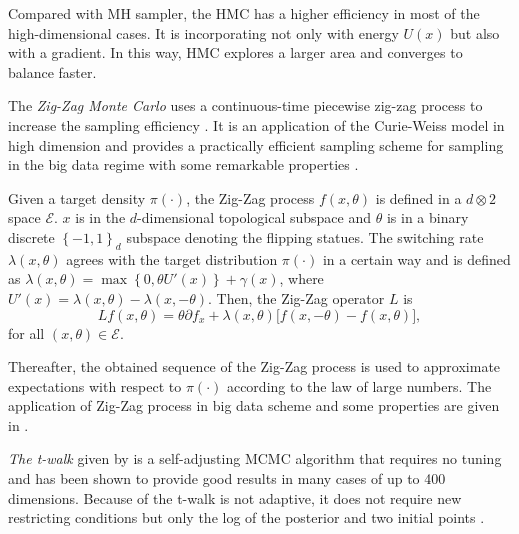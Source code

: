 Compared with MH sampler, the HMC has a higher efficiency in most of the high-dimensional cases. It is incorporating not only with energy $U(x)$ but also with a gradient. In this way, HMC explores a larger area and converges to balance faster. 


The \textit{Zig-Zag Monte Carlo} uses a continuous-time piecewise zig-zag process to increase the sampling efficiency \citep{bierkens2016piecewise}. It is an application of the Curie-Weiss model in high dimension and provides a practically efficient sampling scheme for sampling in the big data regime with some remarkable properties \citep{turitsyn2011irreversible, bierkens2017limit}. 

Given a target density $\pi(\cdot)$, the Zig-Zag process $f(x,\theta)$ is defined in a $d \otimes 2$ space $\mathcal{E}$. $x$ is in the $d$-dimensional topological subspace and $\theta$ is in a binary discrete $\left\lbrace -1,1\right\rbrace_d$ subspace denoting the flipping statues. The switching rate $\lambda(x,\theta)$ agrees with the target distribution $\pi(\cdot)$ in a certain way and is defined as $\lambda(x,\theta) = \max \left\lbrace 0,\theta U'(x) \right\rbrace +\gamma(x)$, where $U'(x)  = \lambda(x,\theta) - \lambda(x,-\theta)$. Then, the Zig-Zag operator $L$ is 
\begin{equation}
Lf(x,\theta)=\theta\partial f_x+\lambda(x,\theta)\lbrack f(x,-\theta)-f(x,\theta )\rbrack,
\end{equation}
for all $(x,\theta)\in \mathcal{E}$. 

Thereafter, the obtained sequence of the Zig-Zag process is used to approximate expectations with respect to $\pi(\cdot)$ according to the law of large numbers. 
The application of Zig-Zag process in big data scheme and some properties are given in \citep{bierkens2017limit}. %




\textit{The t-walk} given by \cite{christen2010general} is a self-adjusting MCMC algorithm that requires no tuning and has been shown to provide good results in many cases of up to 400 dimensions. Because of the t-walk is not adaptive, it does not require new restricting conditions but only the log of the posterior and two initial points \citep{blaauw2011flexible}. 

